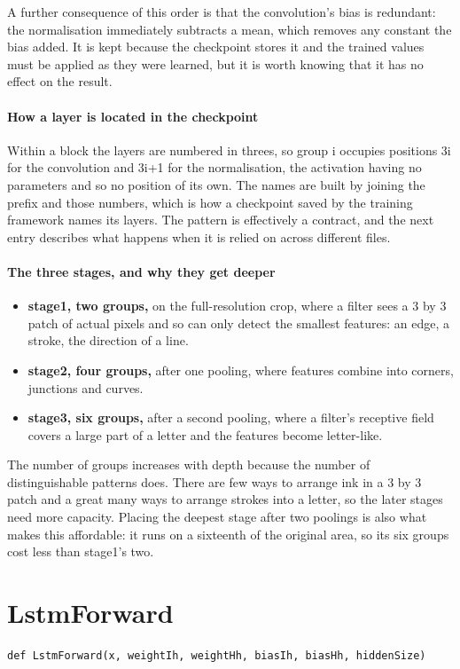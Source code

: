 A further consequence of this order is that the convolution's bias is redundant: the normalisation immediately subtracts a mean, which removes any constant the bias added. It is kept because the checkpoint stores it and the trained values must be applied as they were learned, but it is worth knowing that it has no effect on the result.


\paragraph{How a layer is located in the checkpoint}
Within a block the layers are numbered in threes, so group i occupies positions 3i for the convolution and 3i+1 for the normalisation, the activation having no parameters and so no position of its own. The names are built by joining the prefix and those numbers, which is how a checkpoint saved by the training framework names its layers. The pattern is effectively a contract, and the next entry describes what happens when it is relied on across different files.


\paragraph{The three stages, and why they get deeper}

\begin{itemize}\setlength\itemsep{0pt}
  \item \textbf{stage1, two groups,} on the full-resolution crop, where a filter sees a 3 by 3 patch of actual pixels and so can only detect the smallest features: an edge, a stroke, the direction of a line.
  \item \textbf{stage2, four groups,} after one pooling, where features combine into corners, junctions and curves.
  \item \textbf{stage3, six groups,} after a second pooling, where a filter's receptive field covers a large part of a letter and the features become letter-like.
\end{itemize}
The number of groups increases with depth because the number of distinguishable patterns does. There are few ways to arrange ink in a 3 by 3 patch and a great many ways to arrange strokes into a letter, so the later stages need more capacity. Placing the deepest stage after two poolings is also what makes this affordable: it runs on a sixteenth of the original area, so its six groups cost less than stage1's two.


\section{LstmForward}
\begin{lstlisting}[style=sig]
def LstmForward(x, weightIh, weightHh, biasIh, biasHh, hiddenSize)
\end{lstlisting}

